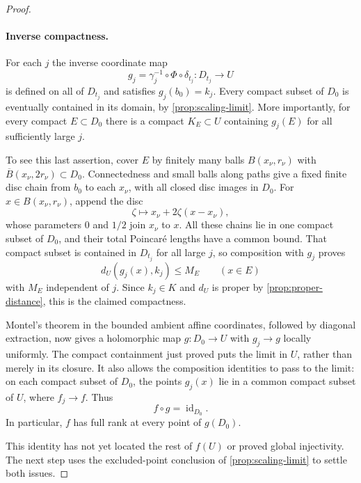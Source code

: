 \begin{proof}
\paragraph{Inverse compactness.}
For each $j$ the inverse coordinate map
\[
 g_j=\gamma_j^{-1}\circ\Phi\circ\delta_{t_j}:D_{t_j}\longrightarrow U
\]
is defined on all of $D_{t_j}$ and satisfies $g_j(b_0)=k_j$.  Every compact subset of $D_0$ is eventually contained in its domain, by \cref{prop:scaling-limit}.  More importantly, for every compact $E\subset D_0$ there is a compact $K_E\subset U$ containing $g_j(E)$ for all sufficiently large $j$.

To see this last assertion, cover $E$ by finitely many balls $B(x_\nu,r_\nu)$ with $\overline B(x_\nu,2r_\nu)\subset D_0$. Connectedness and small balls along paths give a fixed finite disc chain from $b_0$ to each $x_\nu$, with all closed disc images in $D_0$. For $x\in B(x_\nu,r_\nu)$, append the disc
\[
 \zeta\longmapsto x_\nu+2\zeta(x-x_\nu),
\]
whose parameters $0$ and $1/2$ join $x_\nu$ to $x$.  All these chains lie in one compact subset of $D_0$, and their total Poincar\'e lengths have a common bound.  That compact subset is contained in $D_{t_j}$ for all large $j$, so composition with $g_j$ proves
\[
 d_U(g_j(x),k_j)\le M_E\qquad(x\in E)
\]
with $M_E$ independent of $j$.  Since $k_j\in K$ and $d_U$ is proper by \cref{prop:proper-distance}, this is the claimed compactness.

Montel's theorem in the bounded ambient affine coordinates, followed by diagonal extraction, now gives a holomorphic map $g:D_0\to U$ with $g_j\to g$ locally uniformly.  The compact containment just proved puts the limit in $U$, rather than merely in its closure.  It also allows the composition identities to pass to the limit: on each compact subset of $D_0$, the points $g_j(x)$ lie in a common compact subset of $U$, where $f_j\to f$.  Thus
\begin{equation}
\label{eq:one-composition}
 f\circ g=\operatorname{id}_{D_0}.
\end{equation}
In particular, $f$ has full rank at every point of $g(D_0)$.

This identity has not yet located the rest of $f(U)$ or proved global injectivity. The next step uses the excluded-point conclusion of \cref{prop:scaling-limit} to settle both issues.


\end{proof}
